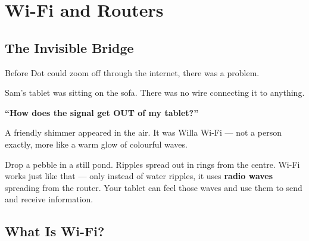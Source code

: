 
\chapter{Wi-Fi and Routers}


\section*{The Invisible Bridge}

Before Dot could zoom off through the internet, there was a problem.

Sam's tablet was sitting on the sofa.
There was no wire connecting it to anything.

\begin{center}
  \Large\bfseries\color{WarmOrange}
  ``How does the signal get OUT of my tablet?''
\end{center}

A friendly shimmer appeared in the air.
It was Willa Wi-Fi — not a person exactly, more like a warm glow of colourful waves.


\vspace{6pt}

\begin{picturethis}
  Drop a pebble in a still pond.
  Ripples spread out in rings from the centre.
  Wi-Fi works just like that —
  only instead of water ripples, it uses \textbf{radio waves} spreading from the router.
  Your tablet can feel those waves and use them to send and receive information.
\end{picturethis}

\sectionrule

\section*{What Is Wi-Fi?}

